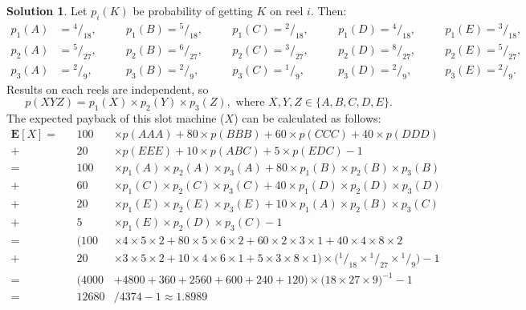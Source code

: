 \documentclass[11pt]{article}
\theoremstyle{definition}
\newtheorem*{solution}{Solution}
\begin{document}
\begin{solution}
Let $p_i(K)$ be probability of getting $K$ on reel $i$. Then:
\begin{align*}
p_1(A) &= {^4}/_{18},\quad &&p_1(B) = {^5}/_{18},\quad &&p_1(C) = {^2}/_{18},\quad &&p_1(D) = {^4}/_{18},\quad &&p_1(E) = {^3}/_{18}, \\
p_2(A) &= {^5}/_{27},\quad &&p_2(B) = {^6}/_{27},\quad &&p_2(C) = {^3}/_{27},\quad &&p_2(D) = {^8}/_{27},\quad &&p_2(E) = {^5}/_{27}, \\
p_3(A) &= {^2}/_{9},\quad &&p_3(B) = {^2}/_{9},\quad &&p_3(C) = {^1}/_{9},\quad &&p_3(D) = {^2}/_{9},\quad &&p_3(E) = {^2}/_{9}.
\end{align*}
Results on each reels are independent, so
$$ p(XYZ) = p_1(X) \times p_2(Y) \times p_3(Z),\text{ where }X,Y,Z \in \{A, B, C, D, E\}.$$
The expected payback of this slot machine ($X$) can be calculated as follows:
\begin{align*}
\textbf{E}[X] =&& 100&\times p(AAA) + 80\times p(BBB) + 60\times p(CCC) + 40\times p(DDD) \\
+&& 20&\times p(EEE) + 10\times p(ABC) + 5\times p(EDC) - 1\\
=&& 100&\times p_1(A)\times p_2(A) \times p_3(A) + 80\times p_1(B)\times p_2(B) \times p_3(B) 
\\+&& 60&\times p_1(C)\times p_2(C) \times p_3(C) + 40\times p_1(D)\times p_2(D) \times p_3(D) 
\\+&& 20&\times p_1(E)\times p_2(E) \times p_3(E) + 10\times p_1(A)\times p_2(B) \times p_3(C) \\
+&& 5&\times p_1(E)\times p_2(D) \times p_3(C) - 1\\
=&& \Big(100&\times4\times5\times2 + 80\times5\times6\times2 + 60\times2\times3\times1 + 40\times4\times8\times2 \\
+&& 20&\times3\times5\times2 + 10\times4\times6\times1 + 5\times3\times8\times1 \Big) \times \Big({^1}/_{18} \times {^1}/_{27} \times {^1}/_{9}\Big) -1\\
=&& \Big(4000& + 4800 + 360 + 2560 + 600 + 240 + 120 \Big) \times 
\Big(18\times27\times9\Big)^{-1} - 1\\
=&& 12680& / 4374 - 1 \approx 1.8989
\end{align*}


\end{solution}
\end{document}
